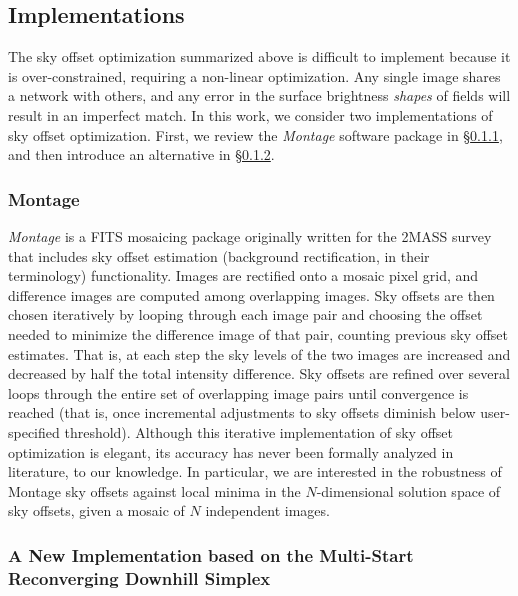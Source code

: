 \documentclass[iop]{emulateapj}
\newcommand{\sw}[1]{\textit{#1}} %
\newcommand{\Sec}[1]{\S\ref{sec:#1}}  %
\begin{document}

\subsection{Implementations}
\label{sec:offset_algos}

The sky offset optimization summarized above is difficult to implement because it is over-constrained, requiring a non-linear optimization.
Any single image shares a network with others, and any error in the surface brightness \emph{shapes} of fields will result in an imperfect match.
In this work, we consider two implementations of sky offset optimization.
First, we review the \sw{Montage} software package in \Sec{montage_algo}, and then introduce an alternative in \Sec{msrnm_algo}.

\subsubsection{Montage}
\label{sec:montage_algo}

\sw{Montage} is a FITS mosaicing package \citep{Berriman:2008} originally written for the 2MASS survey that includes sky offset estimation (background rectification, in their terminology) functionality.
Images are rectified onto a mosaic pixel grid, and difference images are computed among overlapping images.
Sky offsets are then chosen iteratively by looping through each image pair and choosing the offset needed to minimize the difference image of that pair, counting previous sky offset estimates.
That is, at each step the sky levels of the two images are increased and decreased by half the total intensity difference.
Sky offsets are refined over several loops through the entire set of overlapping image pairs until convergence is reached (that is, once incremental adjustments to sky offsets diminish below user-specified threshold).
Although this iterative implementation of sky offset optimization is elegant, its accuracy has never been formally analyzed in literature, to our knowledge.
In particular, we are interested in the robustness of Montage sky offsets against local minima in the $N$-dimensional solution space of sky offsets, given a mosaic of $N$ independent images.

\subsubsection{A New Implementation based on the Multi-Start Reconverging Downhill Simplex}
\label{sec:msrnm_algo}
\end{document}
